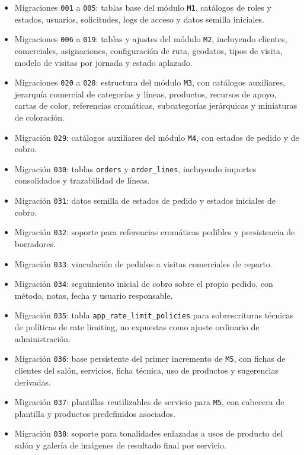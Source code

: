 \begin{itemize}
    \item Migraciones \texttt{001} a \texttt{005}: tablas base del módulo \texttt{M1}, catálogos de roles y estados, usuarios, solicitudes, logs de acceso y datos semilla iniciales.
    \item Migraciones \texttt{006} a \texttt{019}: tablas y ajustes del módulo \texttt{M2}, incluyendo clientes, comerciales, asignaciones, configuración de ruta, geodatos, tipos de visita, modelo de visitas por jornada y estado aplazado.
    \item Migraciones \texttt{020} a \texttt{028}: estructura del módulo \texttt{M3}, con catálogos auxiliares, jerarquía comercial de categorías y líneas, productos, recursos de apoyo, cartas de color, referencias cromáticas, subcategorías jerárquicas y miniaturas de coloración.
    \item Migración \texttt{029}: catálogos auxiliares del módulo \texttt{M4}, con estados de pedido y de cobro.
    \item Migración \texttt{030}: tablas \texttt{orders} y \texttt{order\_lines}, incluyendo importes consolidados y trazabilidad de líneas.
    \item Migración \texttt{031}: datos semilla de estados de pedido y estados iniciales de cobro.
    \item Migración \texttt{032}: soporte para referencias cromáticas pedibles y persistencia de borradores.
    \item Migración \texttt{033}: vinculación de pedidos a visitas comerciales de reparto.
    \item Migración \texttt{034}: seguimiento inicial de cobro sobre el propio pedido, con método, notas, fecha y usuario responsable.
    \item Migración \texttt{035}: tabla \texttt{app\_rate\_limit\_policies} para sobrescrituras técnicas de políticas de rate limiting, no expuestas como ajuste ordinario de administración.
    \item Migración \texttt{036}: base persistente del primer incremento de \texttt{M5}, con fichas de clientes del salón, servicios, ficha técnica, uso de productos y sugerencias derivadas.
    \item Migración \texttt{037}: plantillas reutilizables de servicio para \texttt{M5}, con cabecera de plantilla y productos predefinidos asociados.
    \item Migración \texttt{038}: soporte para tonalidades enlazadas a usos de producto del salón y galería de imágenes de resultado final por servicio.

\end{itemize}
